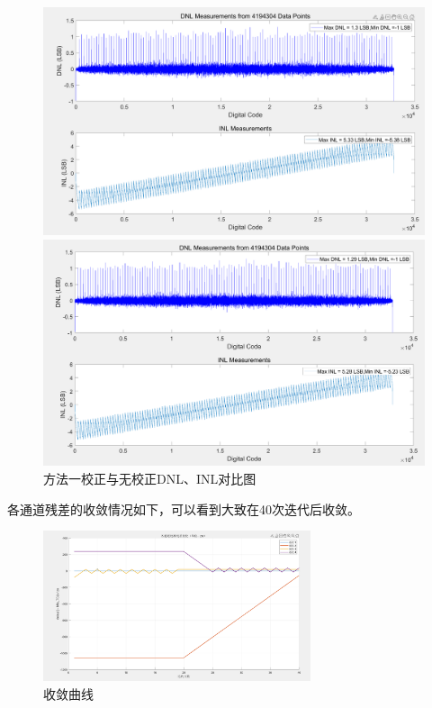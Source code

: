 \documentclass[cs4size,a4paper]{ctexart}
\numberwithin{equation}{section}
\numberwithin{table}{section}
\numberwithin{figure}{section}
\begin{document}
			\begin{figure}[H]
				\centering
				\begin{minipage}{0.49\linewidth}
					\centering
					\includegraphics[width=0.9\linewidth]{figure/MAD_DNL1.png}
				\end{minipage}
				\begin{minipage}{0.49\linewidth}
					\centering
					\includegraphics[width=0.9\linewidth]{figure/MAD_DNL2.png}
				\end{minipage}
				\caption{方法一校正与无校正DNL、INL对比图} 
			\end{figure}
			各通道残差的收敛情况如下，可以看到大致在40次迭代后收敛。

		\begin{figure}[H]
			\centering
			\includegraphics[width=0.7\textwidth]{figure/shoulianquxian.png}
			\caption{收敛曲线} 
		\end{figure}
\end{document}
